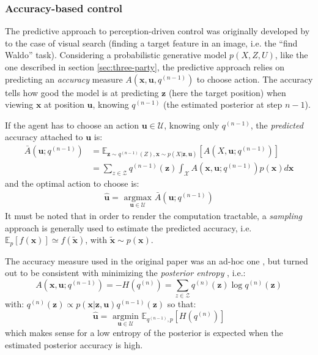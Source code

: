 \documentclass[12pt,twoside,openright]{article}
\begin{document}
\subsubsection{Accuracy-based control}\label{sec:infomax}


The predictive approach to perception-driven control was originally developed by \cite{najemnik2005optimal} to the case of visual search (finding a target feature in an image, i.e. the ``find Waldo'' task).
Considering a  probabilistic generative model $p(X,Z,U)$, like the one described in section \ref{sec:three-party}, the predictive approach relies on predicting an \emph{accuracy} measure $A(\boldsymbol{x}, \boldsymbol{u}, q^{(n-1)})$ to choose action. 
The accuracy tells how good the model is at predicting $\boldsymbol{z}$ (here the target position) when viewing $\boldsymbol{x}$ at position $\boldsymbol{u}$,
knowing $q^{(n-1)}$ (the estimated posterior at step $n-1$).

If the agent has to choose an action $\boldsymbol{u} \in \mathcal{U}$, knowing only $q^{(n-1)}$, the \emph{predicted} accuracy attached to $\boldsymbol{u}$ is:
\begin{align*}
\bar{A}(\boldsymbol{u}; q^{(n-1)})
&= \mathbb{E}_{\boldsymbol{z} \sim q^{(n-1)}(Z), \boldsymbol{x} \sim p(X|\boldsymbol{z}, \boldsymbol{u})}\left[A(X, \boldsymbol{u}; q^{(n-1)})\right]  \\
&= \sum_{z\in\mathcal{Z}} q^{(n-1)}(\boldsymbol{z}) \int_{\mathcal{X}}  A(\boldsymbol{x}, \boldsymbol{u}; q^{(n-1)}) p(\boldsymbol{x}) d\boldsymbol{x}  
\end{align*}
and the optimal action to choose is:
\begin{align*}
\hat{\boldsymbol{u}} = \underset{\boldsymbol{u} \in \mathcal{U}}{\text{ argmax }} \bar{A}(\boldsymbol{u}; q^{(n-1)})
\end{align*} 
It must be noted that in order to render the computation tractable, a \emph{sampling} approach is generally used to estimate the predicted accuracy, i.e. $\mathbb{E}_p[f(\boldsymbol{x})] \simeq f(\tilde{\boldsymbol{x}})$, with $\tilde{\boldsymbol{x}}\sim p(\boldsymbol{x})$.

The accuracy measure used in the original paper was an ad-hoc one \cite{najemnik2005optimal}, but turned out to be consistent with minimizing the \emph{posterior entropy} \cite{najemnik2009simple}, i.e.:
$$A(\boldsymbol{x}, \boldsymbol{u}; q^{(n-1)}) = -H(q^{(n)}) = \sum_{z \in \mathcal{Z}} q^{(n)}(\boldsymbol{z}) \log q^{(n)}(\boldsymbol{z})$$
with: $q^{(n)}(\boldsymbol{z}) \propto p(\boldsymbol{x|\boldsymbol{z}, \boldsymbol{u}})q^{(n-1)}(\boldsymbol{z}) $
so that:
$$\hat{\boldsymbol{u}} = \underset{\boldsymbol{u} \in \mathcal{U}}{\text{ argmin }} \mathbb{E}_{q^{(n-1)},p}\left[H(q^{(n)})\right] $$ 
which makes sense for a low entropy of the posterior is expected when the estimated posterior accuracy is high.
\end{document}
